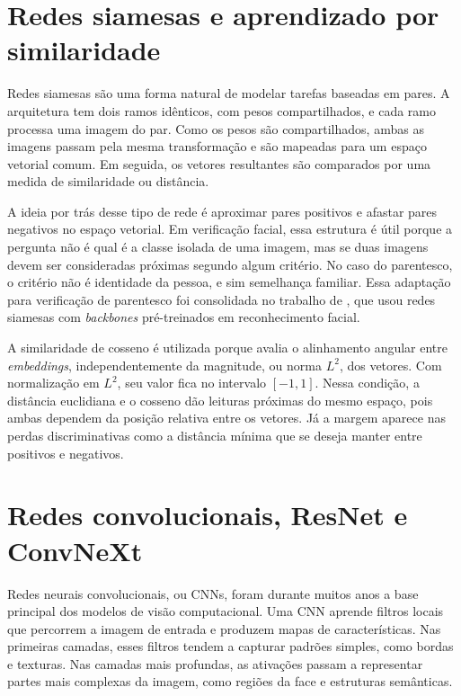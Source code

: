 \section{Redes siamesas e aprendizado por similaridade}

Redes siamesas são uma forma natural de modelar tarefas baseadas em pares. A arquitetura tem dois ramos idênticos, com pesos compartilhados, e cada ramo processa uma imagem do par. Como os pesos são compartilhados, ambas as imagens passam pela mesma transformação e são mapeadas para um espaço vetorial comum. Em seguida, os vetores resultantes são comparados por uma medida de similaridade ou distância.

A ideia por trás desse tipo de rede é aproximar pares positivos e afastar pares negativos no espaço vetorial. Em verificação facial, essa estrutura é útil porque a pergunta não é qual é a classe isolada de uma imagem, mas se duas imagens devem ser consideradas próximas segundo algum critério. No caso do parentesco, o critério não é identidade da pessoa, e sim semelhança familiar. Essa adaptação para verificação de parentesco foi consolidada no trabalho de , que usou redes siamesas com \textit{backbones} pré-treinados em reconhecimento facial.

A similaridade de cosseno é utilizada porque avalia o alinhamento angular entre \textit{embeddings}, independentemente da magnitude, ou norma $L^2$, dos vetores. Com normalização em $L^2$, seu valor fica no intervalo $[-1, 1]$. Nessa condição, a distância euclidiana e o cosseno dão leituras próximas do mesmo espaço, pois ambas dependem da posição relativa entre os vetores. Já a margem aparece nas perdas discriminativas como a distância mínima que se deseja manter entre positivos e negativos.

\section{Redes convolucionais, ResNet e ConvNeXt}

Redes neurais convolucionais, ou CNNs, foram durante muitos anos a base principal dos modelos de visão computacional. Uma CNN aprende filtros locais que percorrem a imagem de entrada e produzem mapas de características. Nas primeiras camadas, esses filtros tendem a capturar padrões simples, como bordas e texturas. Nas camadas mais profundas, as ativações passam a representar partes mais complexas da imagem, como regiões da face e estruturas semânticas.

